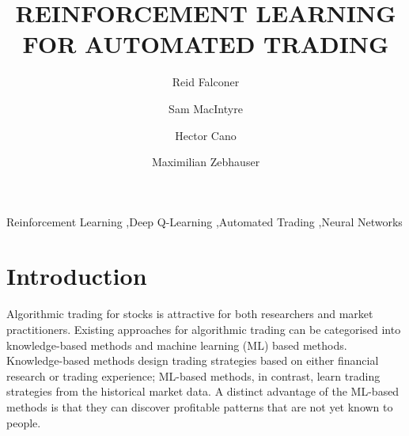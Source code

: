 \documentclass[12pt, authoryear]{elsarticle}
\begin{document}
	
	\begin{frontmatter}  %
		
		\title{REINFORCEMENT LEARNING FOR AUTOMATED TRADING
		}
		
		\author[Add1]{Reid Falconer}
		
		\author[Add1]{Sam MacIntyre}
		
		\author[Add1]{Hector Cano}

		\author[Add1]{Maximilian Zebhauser}

		
		\address[Add1]{Barcelona Graduate School of Economics, Barcelona, Spain}
		
		
		
		
		\begin{keyword}
			\footnotesize{
				Reinforcement Learning \sep  Deep Q-Learning \sep Automated Trading \sep Neural Networks\\ \vspace{0.3cm}
			}
		\end{keyword}
		\vspace{0.5cm}
	\end{frontmatter}
	
	\headsep 25pt %

\section{Introduction}
Algorithmic trading for stocks is attractive for both researchers and market practitioners. Existing approaches for algorithmic trading can be categorised into knowledge-based methods and machine learning (ML) based methods. Knowledge-based methods design trading strategies based on either financial research or trading experience; ML-based methods, in contrast, learn trading strategies from the historical market data. A distinct advantage of the ML-based methods is that they can discover profitable patterns that are not yet known to people. 
\end{document}
